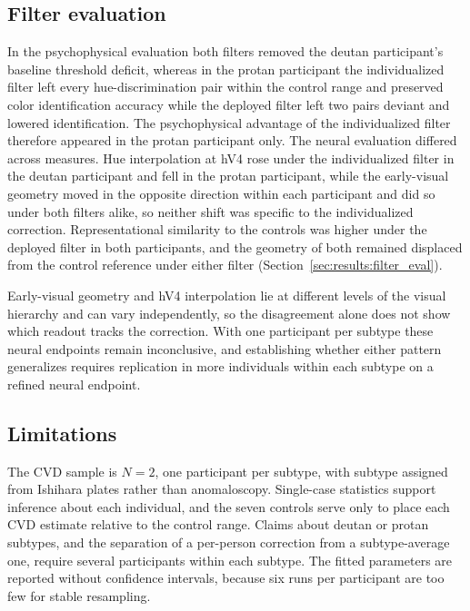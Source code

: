 \subsection{Filter evaluation}
In the psychophysical evaluation both filters removed the deutan participant's baseline threshold deficit, whereas in the protan participant the individualized filter left every hue-discrimination pair within the control range and preserved color identification accuracy while the deployed filter left two pairs deviant and lowered identification. The psychophysical advantage of the individualized filter therefore appeared in the protan participant only. The neural evaluation differed across measures. Hue interpolation at hV4 rose under the individualized filter in the deutan participant and fell in the protan participant, while the early-visual geometry moved in the opposite direction within each participant and did so under both filters alike, so neither shift was specific to the individualized correction. Representational similarity to the controls was higher under the deployed filter in both participants, and the geometry of both remained displaced from the control reference under either filter (Section~\ref{sec:results:filter_eval}).

Early-visual geometry and hV4 interpolation lie at different levels of the visual hierarchy and can vary independently, so the disagreement alone does not show which readout tracks the correction. With one participant per subtype these neural endpoints remain inconclusive, and establishing whether either pattern generalizes requires replication in more individuals within each subtype on a refined neural endpoint.

\subsection{Limitations}
The CVD sample is $N = 2$, one participant per subtype, with subtype assigned from Ishihara plates rather than anomaloscopy. Single-case statistics \parencite{crawford1998} support inference about each individual, and the seven controls serve only to place each CVD estimate relative to the control range. Claims about deutan or protan subtypes, and the separation of a per-person correction from a subtype-average one, require several participants within each subtype. The fitted parameters are reported without confidence intervals, because six runs per participant are too few for stable resampling.

